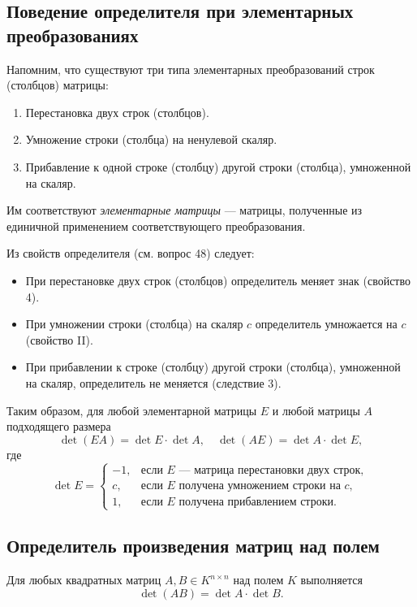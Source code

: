 \documentclass[a4paper,12pt]{article}
\theoremstyle{definition}
\theoremstyle{plain}
\theoremstyle{remark}
\begin{document}
	\subsection{Поведение определителя при элементарных преобразованиях}
	
	Напомним, что существуют три типа элементарных преобразований строк (столбцов) матрицы:
	\begin{enumerate}
		\item Перестановка двух строк (столбцов).
		\item Умножение строки (столбца) на ненулевой скаляр.
		\item Прибавление к одной строке (столбцу) другой строки (столбца), умноженной на скаляр.
	\end{enumerate}
	
	Им соответствуют \textit{элементарные матрицы} — матрицы, полученные из единичной применением соответствующего преобразования.
	
	Из свойств определителя (см. вопрос 48) следует:
	\begin{itemize}
		\item При перестановке двух строк (столбцов) определитель меняет знак (свойство 4).
		\item При умножении строки (столбца) на скаляр \( c \) определитель умножается на \( c \) (свойство II).
		\item При прибавлении к строке (столбцу) другой строки (столбца), умноженной на скаляр, определитель не меняется (следствие 3).
	\end{itemize}
	
	Таким образом, для любой элементарной матрицы \( E \) и любой матрицы \( A \) подходящего размера
	\[
	\det(EA) = \det E \cdot \det A, \quad \det(AE) = \det A \cdot \det E,
	\]
	где
	\[
	\det E = 
	\begin{cases}
		-1, & \text{если } E \text{ — матрица перестановки двух строк}, \\
		c, & \text{если } E \text{ получена умножением строки на } c, \\
		1, & \text{если } E \text{ получена прибавлением строки}.
	\end{cases}
	\]
	
	\subsection{Определитель произведения матриц над полем}
	
	\begin{tcolorbox}[colback=green!5, colframe=green!50!black, title=Теорема]
		Для любых квадратных матриц \( A, B \in K^{n \times n} \) над полем \( K \) выполняется
		\[
		\det(AB) = \det A \cdot \det B.
		\]
	\end{tcolorbox}
	
\end{document}
